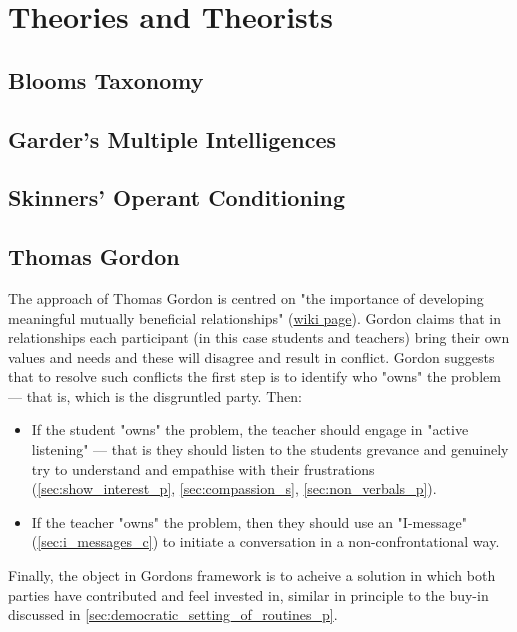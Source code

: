 \documentclass[12pt]{report}
\begin{document}
\chapter{Theories and Theorists}
\label{chap:theories}


\section{Blooms Taxonomy}
\label{sec:blooms_taxonomy}




\section{Garder's Multiple Intelligences}
\label{sec:gardner_theory}


\section{Skinners' Operant Conditioning}
\label{sec:skinner_theory}


\section{Thomas Gordon}
\label{sec:gordon_theory}

The approach of Thomas Gordon is centred on "the importance of developing meaningful mutually beneficial relationships" (\href{https://en.wikibooks.org/wiki/Classroom_Management_Theorists_and_Theories/Thomas_Gordon}{wiki page}). Gordon claims that in relationships each participant (in this case students and teachers) bring their own values and needs and these will disagree and result in conflict. Gordon suggests that to resolve such conflicts the first step is to identify who "owns" the problem --- that is, which is the disgruntled party. Then:
\begin{itemize}
  \item If the student "owns" the problem, the teacher should engage in "active listening" --- that is they should listen to the students grevance and genuinely try to understand and empathise with their frustrations (\ref{sec:show_interest_p}, \ref{sec:compassion_s}, \ref{sec:non_verbals_p}).
  \item If the teacher "owns" the problem, then they should use an "I-message" (\ref{sec:i_messages_c}) to initiate a conversation in a non-confrontational way.
\end{itemize}
Finally, the object in Gordons framework is to acheive a solution in which both parties have contributed and feel invested in, similar in principle to the buy-in discussed in \ref{sec:democratic_setting_of_routines_p}.
\end{document}
